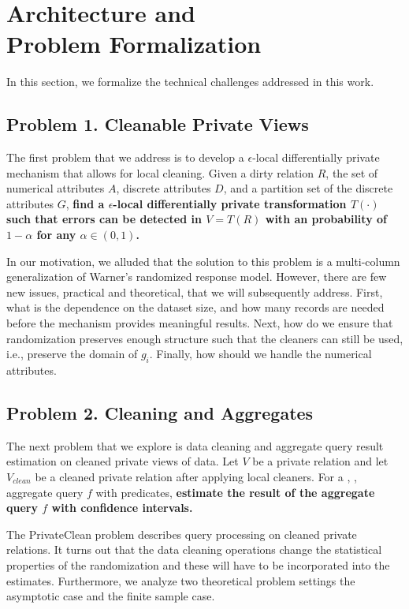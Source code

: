 \section{Architecture and \\Problem Formalization}
In this section, we formalize the technical challenges addressed in this work.

\subsection{Problem 1. Cleanable Private Views}
The first problem that we address is to develop a $\epsilon$-local differentially private mechanism that allows for local cleaning.
Given a dirty relation $R$, the set of numerical attributes $A$, discrete attributes $D$, and a partition set of the discrete attributes $G$, \textbf{find a $\epsilon$-local differentially private transformation $T(\cdot)$ such that errors can be detected in $V=T(R)$ with an probability of $1-\alpha$ for any $\alpha \in (0,1)$.}

In our motivation, we alluded that the solution to this problem is a multi-column generalization of Warner's randomized response model.
However, there are few new issues, practical and theoretical, that we will subsequently address.
First, what is the dependence on the dataset size, and how many records are needed before the mechanism provides meaningful results.
Next, how do we ensure that randomization preserves enough structure such that the cleaners can still be used, i.e., preserve the domain of $g_i$.
Finally, how should we handle the numerical attributes.

\subsection{Problem 2. Cleaning and Aggregates}
The next problem that we explore is data cleaning and aggregate query result estimation on cleaned private views of data.
Let $V$ be a private relation and let $V_{clean}$ be a cleaned private relation after applying local cleaners.
For a \sumfunc, \countfunc, \avgfunc aggregate query $f$ with predicates, \textbf{estimate the result of the aggregate query $f$ with confidence intervals.}

The PrivateClean problem describes query processing on cleaned private relations. 
It turns out that the data cleaning operations change the statistical properties of the
randomization and these will have to be incorporated into the estimates.
Furthermore, we analyze two theoretical problem settings the asymptotic case and the finite sample case.

